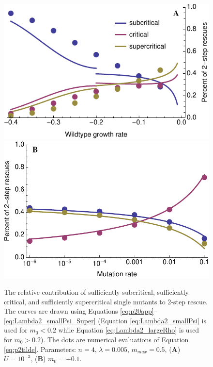 \documentclass[9pt,twocolumn,twoside,lineno]{gsajnl}
\begin{document}
\begin{figure}[htb]
\centering
\includegraphics[width=\linewidth]{../IMAGES/p2RelContrGrowth.pdf}\\
\includegraphics[width=\linewidth]{../IMAGES/p2RelContrMutationSlow.pdf}
\caption{
The relative contribution of sufficiently subcritical, sufficiently critical, and sufficiently supercritical single mutants to 2-step rescue.
The curves are drawn using Equations \ref{eq:p20app}--\ref{eq:Lambda2_smallPsi_Super} (Equation \ref{eq:Lambda2_smallPsi} is used for $m_0<0.2$ while Equation \ref{eq:Lambda2_largeRho} is used for $m_0>0.2$).
The dots are numerical evaluations of Equation \ref{eq:p2tilde}.
Parameters: $n=4$, $\lambda=0.005$, $m_{max}=0.5$, (\textbf{A}) $U=10^{-3}$, (\textbf{B}) $m_0 = -0.1$.
}%
\label{fig:2stepstyle}
\end{figure}
\end{document}
